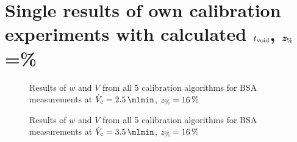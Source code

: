 \section*{Single results of own calibration experiments with calculated $t_\text{void}$, 
  $\bm{z_\text{\%}}$\thinspace=\thinspace\%}
\renewcommand{\subFigSize}{0.49\linewidth}
\begin{figure}[htp]
  \begin{center}
    \begin{subfigure}{\subFigSize}
    \end{subfigure}
    \begin{subfigure}{\subFigSize}
    \end{subfigure}
  \end{center}
  \vspace*{-4ex}    
  \caption[Results of $w$ and $V$ from all 5 calibration algorithms for BSA measurements at
  $\Vc = \SI{2.5}{\mlmin}$, $\zP = \SI{16}{\percent}$]{
    Results of $w$ and $V$ from all 5 calibration algorithms for BSA measurements at
    $\Vc = \SI{2.5}{\mlmin}$, $\zP = \SI{16}{\percent}$
  }
  \label{fig:calibRes_BSA_VC2_5_tvoidCorr}
\end{figure}  
\begin{figure}[htp]
  \begin{center}
    \begin{subfigure}{\subFigSize}
    \end{subfigure}
    \begin{subfigure}{\subFigSize}
    \end{subfigure}
  \end{center}
  \vspace*{-4ex}    
  \caption[Results of $w$ and $V$ from all 5 calibration algorithms for BSA measurements at
  $\Vc = \SI{3.5}{\mlmin}$, $\zP = \SI{16}{\percent}$]{
    Results of $w$ and $V$ from all 5 calibration algorithms for BSA measurements at
    $\Vc = \SI{3.5}{\mlmin}$, $\zP = \SI{16}{\percent}$
  }
  \label{fig:calibRes_BSA_VC3_5_tvoidCorr}
\end{figure}
